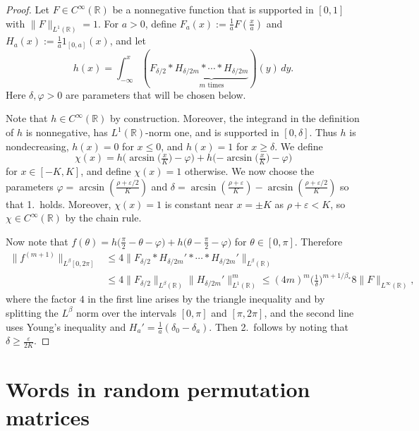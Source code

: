 \documentclass[10pt,reqno]{amsart}
\theoremstyle{definition}
\theoremstyle{remark}
\numberwithin{equation}{section}
\numberwithin{figure}{section}
\numberwithin{table}{section}
\begin{document}
\begin{proof}
Let $F\in C^\infty(\mathbb{R})$ be a nonnegative function that is
supported in $[0,1]$ with $\|F\|_{L^1(\mathbb{R})}=1$.
For $a>0$, define $F_a(x) := \frac{1}{a}F(\frac{x}{a})$
and $H_a(x) := \frac{1}{a}1_{[0,a]}(x)$, and let
$$
        h(x) = \int_{-\infty}^x (F_{\delta/2} *
        \underbrace{H_{\delta/2m} * \cdots * H_{\delta/2m}}_{m\text{ times}})(y)
        \,dy.
$$
Here $\delta,\varphi>0$ are parameters that will be chosen below.

Note that $h\in C^\infty(\mathbb{R})$ by construction.
Moreover, the integrand in the definition of $h$ is nonnegative, has 
$L^1(\mathbb{R})$-norm one, and is supported in $[0,\delta]$.
Thus $h$ is nondecreasing, $h(x)=0$ for $x\le 0$, and
$h(x)=1$ for $x\ge\delta$. We define
$$
        \chi(x) = 
        h\big(\arcsin\big(\tfrac{x}{K}\big)-\varphi\big) +
        h\big({-\arcsin\big(\tfrac{x}{K}\big)}-\varphi\big)
$$
for $x\in[-K,K]$, and define $\chi(x)=1$ otherwise.
We now choose the parameters 
$\varphi=\arcsin(\frac{\rho+\varepsilon/2}{K})$ and $\delta = 
\arcsin(\frac{\rho+\varepsilon}{K})-\arcsin(\frac{\rho+\varepsilon/2}{K})$ 
so that 1.\ holds. Moreover, $\chi(x)=1$ is constant near
$x=\pm K$ as $\rho+\varepsilon<K$, so $\chi\in C^\infty(\mathbb{R})$ by 
the chain rule.

Now note that
$f(\theta) = h\big(\tfrac{\pi}{2}-\theta-\varphi\big) +
h\big(\theta-\tfrac{\pi}{2}-\varphi\big)$
for $\theta\in[0,\pi]$. Therefore
\begin{align*}
        \|f^{(m+1)}\|_{L^\beta[0,2\pi]} &\le
        4\|F_{\delta/2} * H_{\delta/2m}' * 
        \cdots * H_{\delta/2m}'\|_{L^\beta(\mathbb{R})}
\\
        &\le
        4\|F_{\delta/2}\|_{L^\beta(\mathbb{R})}
        \|H_{\delta/2m}'\|_{L^1(\mathbb{R})}^m
        \le 
        (4m)^m \big(\tfrac{1}{\delta}\big)^{m+1/\beta_*}
	8\|F\|_{L^\infty(\mathbb{R})},
\end{align*}
where the factor $4$ in the first line arises by the triangle
inequality and by splitting the $L^\beta$ norm over the intervals
$[0,\pi]$ and $[\pi,2\pi]$, and the second line uses
Young's inequality and $H_a' = \frac{1}{a}(\delta_0-\delta_a)$.
Then 2.\ follows by noting that $\delta\ge \frac{\varepsilon}{2K}$.
\end{proof}


\section{Words in random permutation matrices}
\label{sec:words}
\end{document}
